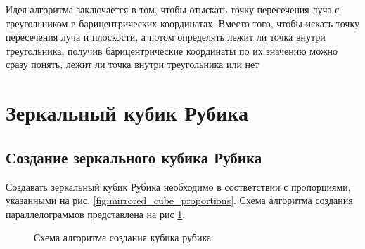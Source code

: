 \documentclass[a4paper, 14pt]{report}
\begin{document}
	Идея алгоритма заключается в том, чтобы отыскать точку пересечения луча с треугольником в барицентрических координатах. Вместо того, чтобы искать точку пересечения луча и плоскости, а потом определять лежит ли точка внутри треугольника, получив барицентрические координаты по их значению можно сразу понять, лежит ли точка внутри треугольника или нет

	\section{Зеркальный кубик Рубика}
	\subsection{Создание зеркального кубика Рубика}
	Создавать зеркальный кубик Рубика необходимо в соответствии с пропорциями, указанными на рис. \ref{fig:mirrored_cube_proportions}. Схема алгоритма создания параллелограммов представлена на рис \ref{fig:rubicks_create}.
	
	\begin{figure}[!ht]
		\caption{Схема алгоритма создания кубика рубика}
		\label{fig:rubicks_create}
	\end{figure}
\end{document}
